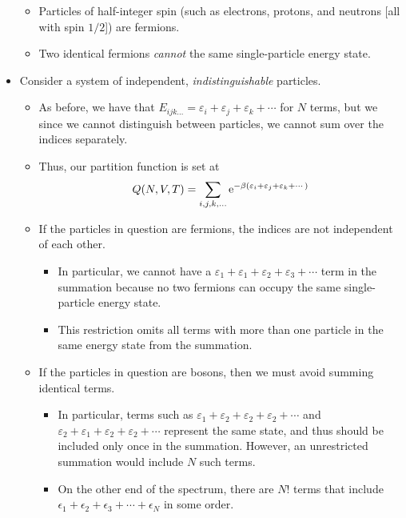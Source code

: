 \documentclass[../notes.tex]{subfiles}
\begin{document}
\begin{itemize}
    \begin{itemize}
        \item Particles of half-integer spin (such as electrons, protons, and neutrons [all with spin $1/2$]) are fermions.
        \item Two identical fermions \emph{cannot} the same single-particle energy state.
    \end{itemize}
    \item Consider a system of independent, \emph{indistinguishable} particles.
    \begin{itemize}
        \item As before, we have that $E_{ijk\dots}=\varepsilon_i+\varepsilon_j+\varepsilon_k+\cdots$ for $N$ terms, but we since we cannot distinguish between particles, we cannot sum over the indices separately.
        \item Thus, our partition function is set at
        \begin{equation*}
            Q(N,V,T) = \sum_{i,j,k,\dots}\e[-\beta(\varepsilon_i+\varepsilon_j+\varepsilon_k+\cdots)]
        \end{equation*}
        \item If the particles in question are fermions, the indices are not independent of each other.
        \begin{itemize}
            \item In particular, we cannot have a $\varepsilon_1+\varepsilon_1+\varepsilon_2+\varepsilon_3+\cdots$ term in the summation because no two fermions can occupy the same single-particle energy state.
            \item This restriction omits all terms with more than one particle in the same energy state from the summation.
        \end{itemize}
        \item If the particles in question are bosons, then we must avoid summing identical terms.
        \begin{itemize}
            \item In particular, terms such as $\varepsilon_1+\varepsilon_2+\varepsilon_2+\varepsilon_2+\cdots$ and $\varepsilon_2+\varepsilon_1+\varepsilon_2+\varepsilon_2+\cdots$ represent the same state, and thus should be included only once in the summation. However, an unrestricted summation would include $N$ such terms.
            \item On the other end of the spectrum, there are $N!$ terms that include $\epsilon_1+\epsilon_2+\epsilon_3+\cdots+\epsilon_N$ in some order.

\end{itemize}
\end{itemize}
\end{itemize}
\end{document}
